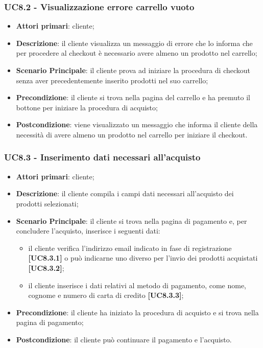 \subsubsection{UC8.2 - Visualizzazione errore carrello vuoto}
\begin{itemize}
\item \textbf{Attori primari}: cliente;
\item \textbf{Descrizione}: il cliente visualizza un messaggio di errore che lo informa che per procedere al checkout è necessario avere almeno un prodotto nel carrello;
\item \textbf{Scenario Principale}: il cliente prova ad iniziare la procedura di checkout senza aver precedentemente inserito prodotti nel suo carrello;
\item \textbf{Precondizione}: il cliente si trova nella pagina del carrello e ha premuto il bottone  per iniziare la procedura di acquisto;
\item \textbf{Postcondizione}: viene visualizzato un messaggio che informa il cliente della necessità di avere almeno un prodotto nel carrello per iniziare il checkout.
\end{itemize}

\subsubsection{UC8.3 - Inserimento dati necessari all'acquisto}
\begin{itemize}
\item \textbf{Attori primari}: cliente;
\item \textbf{Descrizione}: il cliente compila i campi dati necessari all'acquisto dei prodotti selezionati;
\item \textbf{Scenario Principale}: il cliente si trova nella pagina di pagamento e, per concludere l'acquisto, inserisce i seguenti dati:
\begin{itemize}
	\item il cliente verifica l'indirizzo email indicato in fase di registrazione \textbf{[UC8.3.1]} o può indicarne uno diverso per l'invio dei prodotti acquistati \textbf{[UC8.3.2]};
	\item il cliente inserisce i dati relativi al metodo di pagamento, come nome, cognome e numero di carta di credito \textbf{[UC8.3.3]};
\end{itemize}
\item \textbf{Precondizione}: il cliente ha iniziato la procedura di acquisto e si trova nella pagina di pagamento;
\item \textbf{Postcondizione}: il cliente può continuare il pagamento e l'acquisto.
\end{itemize}

